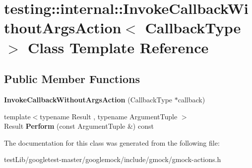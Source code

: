 \hypertarget{classtesting_1_1internal_1_1InvokeCallbackWithoutArgsAction}{}\section{testing\+:\+:internal\+:\+:Invoke\+Callback\+Without\+Args\+Action$<$ Callback\+Type $>$ Class Template Reference}
\label{classtesting_1_1internal_1_1InvokeCallbackWithoutArgsAction}
\subsection*{Public Member Functions}
\begin{DoxyCompactItemize}
\item 
\mbox{\label{classtesting_1_1internal_1_1InvokeCallbackWithoutArgsAction_a333d0b92596759753cf78dc98ee7e270}} 
{\bfseries Invoke\+Callback\+Without\+Args\+Action} (Callback\+Type $\ast$callback)
\item 
\mbox{\label{classtesting_1_1internal_1_1InvokeCallbackWithoutArgsAction_ac43b186c6daa5f21c8377678c6a9d4ba}} 
{\footnotesize template$<$typename Result , typename Argument\+Tuple $>$ }\\Result {\bfseries Perform} (const Argument\+Tuple \&) const
\end{DoxyCompactItemize}


The documentation for this class was generated from the following file\+:\begin{DoxyCompactItemize}
\item 
test\+Lib/googletest-\/master/googlemock/include/gmock/gmock-\/actions.\+h\end{DoxyCompactItemize}
